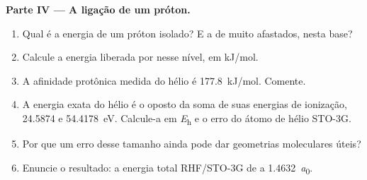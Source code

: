 \begin{problem}
\medskip\noindent\textbf{Parte IV --- A ligação de um próton.}
\begin{enumerate}[resume]
  \item Qual é a energia de um próton isolado? E a de  muito
        afastados, nesta base?
  \item Calcule a energia liberada por  nesse nível, em
        \unit{kJ/mol}.
  \item A afinidade protônica medida do hélio é \qty{177.8}{kJ/mol}.
        Comente.
  \item A energia exata do hélio é o oposto da soma de suas energias de
        ionização, 24.5874 e \qty{54.4178}{eV}. Calcule-a em \unit{\hartree} e
        o erro do átomo de hélio STO-3G.
  \item Por que um erro desse tamanho ainda pode dar geometrias moleculares
        úteis?
  \item Enuncie o resultado: a energia total RHF/STO-3G de  a
        \qty{1.4632}{\bohr}.
\end{enumerate}
\end{problem}
